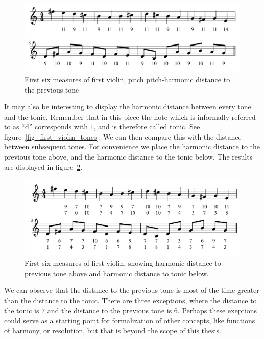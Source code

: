 \documentclass[a4paper]{book}
\theoremstyle{definition}
\begin{document}
\begin{figure}[H]
    \centering
    \includegraphics[scale=0.25]{figures/fig_first_violin_melodic_harmonic_distance.png}
    \caption{First six measures of first violin, pitch pitch-harmonic distance to the previous tone}
    \label{fig_first_violin_melodic_harmonic_distance}
\end{figure}

It may also be interesting to display the harmonic distance between every tone and the tonic.
Remember that in this piece the note which is informally referred to as ``d'' corresponds with $1$, and is therefore called tonic.
See figure~\ref{fig_first_violin_tones}.
We can then compare this with the distance between subsequent tones.
For convenience we place the harmonic distance to the previous tone above, and the harmonic distance to the tonic below.
The results are displayed in figure~\ref{fig_first_violin_harmonic_distance_to_tonic}.

\begin{figure}[H]
    \centering
    \includegraphics[scale=0.25]{figures/fig_first_violin_harmonic_distance_to_tonic.png}
    \caption{First six measures of first violin, showing harmonic distance to previous tone above and harmonic distance to tonic below.}
    \label{fig_first_violin_harmonic_distance_to_tonic}
\end{figure}

We can observe that the distance to the previous tone is most of the time greater than the distance to the tonic.
There are three exceptions, where the distance to the tonic is $7$ and the distance to the previous tone is $6$.
Perhaps these exeptions could serve as a starting point for formalization of other concepts, like functions of harmony, or resolution, but that is beyond the scope of this thesis.
\end{document}
